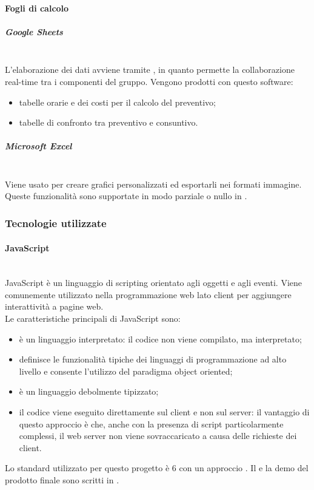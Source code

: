 \paragraph{Fogli di calcolo} \label{sec:fogli_di_calcolo}\mbox{}
\subparagraph{Google Sheets}\mbox{}\\
L'elaborazione dei dati avviene tramite , in quanto permette la collaborazione real-time tra i componenti del gruppo. Vengono prodotti con questo software:
	\begin{itemize}
	\item tabelle orarie e dei costi per il calcolo del preventivo;
	\item tabelle di confronto tra preventivo e consuntivo.
	\end{itemize}

\subparagraph{Microsoft Excel} \mbox{}\\
Viene usato per creare grafici personalizzati ed esportarli nei formati immagine. Queste funzionalità sono supportate in modo parziale o nullo in .

\subsubsection{Tecnologie utilizzate}
\paragraph{JavaScript}\mbox{}\\
JavaScript è un linguaggio di scripting orientato agli oggetti e agli eventi. Viene comunemente utilizzato nella programmazione web lato client per aggiungere interattività a pagine web.\\
Le caratteristiche principali di JavaScript sono:
\begin{itemize}
	\item è un linguaggio interpretato: il codice non viene compilato, ma interpretato;
	\item definisce le funzionalità tipiche dei linguaggi di programmazione ad alto livello e consente l'utilizzo del paradigma object oriented;
	\item è un linguaggio debolmente tipizzato;
	\item il codice viene eseguito direttamente sul client e non sul server: il vantaggio di questo approccio è che, anche con la presenza di script particolarmente complessi, il web server non viene sovraccaricato a causa delle richieste dei client.
\end{itemize}
Lo standard utilizzato per questo progetto è  6 con un approccio .
Il  e la demo del prodotto finale sono scritti in .

